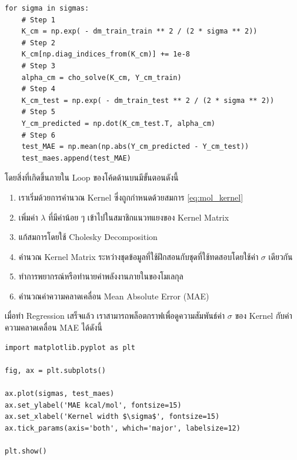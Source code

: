 \begin{lstlisting}[style=MyPython]
for sigma in sigmas:
    # Step 1
    K_cm = np.exp( - dm_train_train ** 2 / (2 * sigma ** 2)) 
    # Step 2
    K_cm[np.diag_indices_from(K_cm)] += 1e-8
    # Step 3
    alpha_cm = cho_solve(K_cm, Y_cm_train)
    # Step 4
    K_cm_test = np.exp( - dm_train_test ** 2 / (2 * sigma ** 2))
    # Step 5
    Y_cm_predicted = np.dot(K_cm_test.T, alpha_cm)
    # Step 6
    test_MAE = np.mean(np.abs(Y_cm_predicted - Y_cm_test))
    test_maes.append(test_MAE)
\end{lstlisting}

\vspace{1em}
โดยสิ่งที่เกิดขึ้นภายใน Loop ของโค้ดด้านบนมีขั้นตอนดังนี้

\begin{enumerate}[noitemsep]
    \item เราเริ่มด้วยการคำนวณ Kernel ซึ่งถูกกำหนดด้วยสมการ \ref{eq:mol_kernel}
    
    \item เพิ่มค่า $\lambda$ ที่มีค่าน้อย ๆ เข้าไปในสมาชิกแนวทแยงของ Kernel Matrix
    
    \item แก้สมการโดยใช้ Cholesky Decomposition
    
    \item คำนวณ Kernel Matrix ระหว่างชุดข้อมูลที่ใช้ฝึกสอนกับชุดที่ใช้ทดสอบโดยใช้ค่า $\sigma$ เดียวกัน
    
    \item ทำการพยากรณ์หรือทำนายค่าพลังงานภายในของโมเลกุล
    
    \item คำนวณค่าความคลาดเคลื่อน Mean Absolute Error (MAE)
\end{enumerate}

เมื่อทำ Regression เสร็จแล้ว เราสามารถพล็อตกราฟเพื่อดูความสัมพันธ์ค่า $\sigma$ ของ Kernel กับค่าความคลาดเคลื่อน MAE ได้ดังนี้

\begin{lstlisting}[style=MyPython]
import matplotlib.pyplot as plt

fig, ax = plt.subplots()

ax.plot(sigmas, test_maes)
ax.set_ylabel('MAE kcal/mol', fontsize=15)
ax.set_xlabel('Kernel width $\sigma$', fontsize=15)
ax.tick_params(axis='both', which='major', labelsize=12)

plt.show()
\end{lstlisting}

